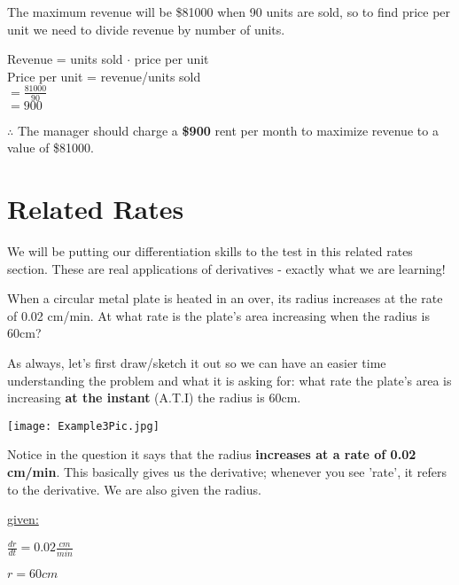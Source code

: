 \documentclass[12pt,fleqn]{book} %
\begin{document}
\noindent The maximum revenue will be \$81000 when 90 units are sold, so to find price per unit we need to divide revenue by number of units.

\begin{center}
    Revenue = units sold $\cdot$ price per unit \\
    Price per unit = revenue/units sold \\
    $= \frac{81000}{90}$ \\
    $=900$
\end{center}

\noindent $\therefore$ The manager should charge a \textbf{\$900} rent per month to maximize revenue to a value of \$81000.

\section{Related Rates}

{\small We will be putting our differentiation skills to the test in this related rates section. These are real applications of derivatives - exactly what we are learning!}

\vspace*{5mm}


\noindent When a circular metal plate is heated in an over, its radius increases at the rate of 0.02 cm/min. At what rate is the plate's area increasing
when the radius is 60cm?

\vspace*{2mm}

\noindent As always, let's first draw/sketch it out so we can have an easier time understanding the problem and what it is asking for: what rate the plate's area
is increasing \textbf{at the instant} (A.T.I) the radius is 60cm.
\vspace*{-7mm}
\begin{center}
    \texttt{[image: Example3Pic.jpg]}
\end{center}
\vspace*{-4mm}
\noindent Notice in the question it says that the radius \textbf{increases at a rate of 0.02 cm/min}. This basically gives us the derivative; whenever you see
'rate', it refers to the derivative. We are also given the radius.

\vspace*{-4mm}

\begin{center}
    \underline{given:}
    \begin{multicols}{2}
        $\frac{dr}{dt}=0.02 \frac{cm}{min}$

        $r=60cm$
    \end{multicols}
\end{center}
\end{document}
